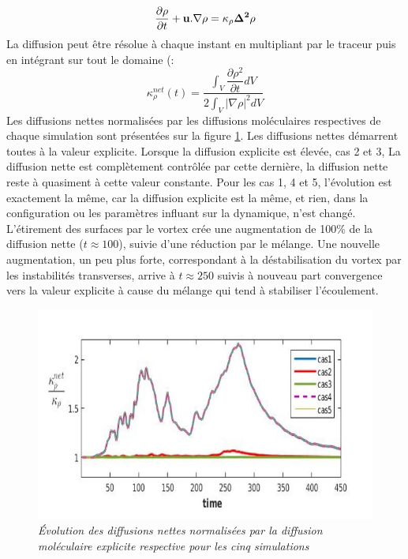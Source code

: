 \documentclass[a4paper,12pt]{article}
\begin{document}
    \begin{equation}
        \label{}
        \frac{\partial \rho}{\partial t} + \bf u.\nabla\rho = \kappa_{\rho}\Delta^2\rho
    \end{equation}
    La diffusion peut être résolue à chaque instant en multipliant par le traceur puis en intégrant sur tout le domaine (\cite{penney_diapycnal_2020}:
    \begin{equation}
        \kappa_{\rho}^{net}(t)= \frac{\int_V \dfrac{\partial\rho^2}{\partial t}dV}{2\int_V |\nabla\rho|^2dV}
    \end{equation}
    Les diffusions nettes normalisées par les diffusions moléculaires respectives de chaque simulation sont présentées sur la figure \ref{kappanet}. Les diffusions nettes démarrent toutes à la valeur explicite. Lorsque la diffusion explicite est élevée, cas 2 et 3, La diffusion nette est complètement contrôlée par cette dernière, la diffusion nette reste à quasiment à cette valeur constante. Pour les cas 1, 4 et 5, l'évolution est exactement la même, car la diffusion explicite est la même, et rien, dans la configuration ou les paramètres influant sur la dynamique, n'est changé. L'étirement des surfaces par le vortex crée une augmentation de 100\% de la diffusion nette ($t\approx100$), suivie d'une réduction par le mélange. Une nouvelle augmentation, un peu plus forte, correspondant à la déstabilisation du vortex par les instabilités transverses, arrive à $t\approx250$ suivis à nouveau part convergence vers la valeur explicite à cause du mélange qui tend à stabiliser l'écoulement.
    \begin{figure}[!h]
        \centering
        \includegraphics[width=0.9\linewidth]{figures/kappanet_rho.jpg}
        \caption{\textit{Évolution des diffusions nettes normalisées par la diffusion moléculaire explicite respective pour les cinq simulations}}
        \label{kappanet}
    \end{figure}
\end{document}
